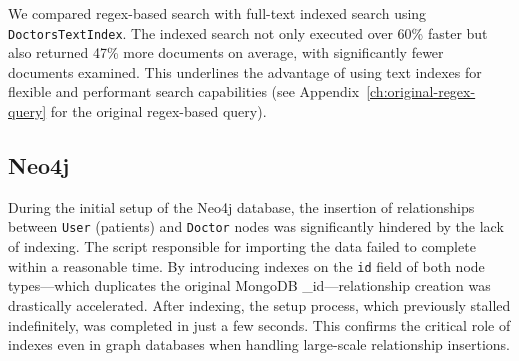We compared regex-based search with full-text indexed search using \texttt{DoctorsTextIndex}. The indexed search not only executed over 60\% faster but also returned 47\% more documents on average, with significantly fewer documents examined. This underlines the advantage of using text indexes for flexible and performant search capabilities (see Appendix~\ref{ch:original-regex-query} for the original regex-based query).

\subsection{Neo4j}


During the initial setup of the Neo4j database, the insertion of relationships between \texttt{User} (patients) and \texttt{Doctor} nodes was significantly hindered by the lack of indexing. The script responsible for importing the data failed to complete within a reasonable time. By introducing indexes on the \texttt{id} field of both node types—which duplicates the original MongoDB \_id—relationship creation was drastically accelerated. After indexing, the setup process, which previously stalled indefinitely, was completed in just a few seconds. This confirms the critical role of indexes even in graph databases when handling large-scale relationship insertions.
